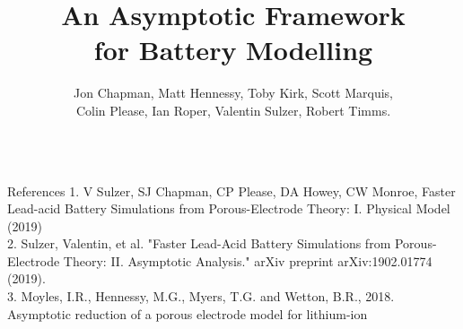 \documentclass{beamer}
\author[]{
  	Jon Chapman,
  	Matt Hennessy,
  	Toby Kirk,
	Scott Marquis,\\
  	Colin Please,
  	Ian Roper,
	Valentin Sulzer,
	Robert Timms.
  }
\title{An Asymptotic Framework\\ for Battery Modelling}
\institute{Your Institution}
\begin{document}
\begin{frame}[fragile]\centering

  

\begin{columns}
  \begin{column}{0.91\linewidth}
	\begin{block}{References}
	  \footnotesize
	1. V Sulzer, SJ Chapman, CP Please, 
	DA Howey, CW Monroe, Faster Lead-acid Battery Simulations from Porous-Electrode Theory: I. Physical Model (2019) \\
	2. Sulzer, Valentin, et al. "Faster 
	Lead-Acid Battery Simulations from 
	Porous-Electrode Theory: II. Asymptotic 
	Analysis." arXiv preprint 
	arXiv:1902.01774 (2019). \\ 
	3. Moyles, I.R., Hennessy, M.G., 
	Myers, T.G. and Wetton, B.R., 2018. 
	Asymptotic reduction of a porous 
	electrode model for lithium-ion 
	\end{block}
  \end{column}
\end{columns}

\end{frame}
\end{document}
